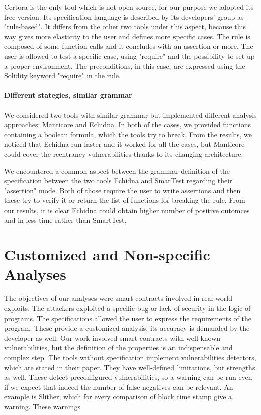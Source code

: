Certora is the only tool which is not open-source, for our purpose we adopted its free version.
Its specification language is described by its developers' group as "rule-based". It differs from the other two tools under this aspect, because this way gives more elasticity to the user and defines more specific cases.
The rule is composed of some function calls and it concludes with an assertion or more. The user is allowed to test a specific case, using "require" and the possibility to set up a proper environment. 
The preconditions, in this case, are expressed using the Solidity keyword "require" in the rule.

\paragraph{Different stategies, similar grammar}
We considered two tools with similar grammar but implemented different analysis approaches: Manticore and Echidna. 
In both of the cases, we provided functions containing a boolean formula, which the tools try to break. From the results, 
we noticed that Echidna run faster and it worked for all the cases, but Manticore could cover the reentrancy vulnerabilities thanks to its changing architecture.

We encountered a common aspect between the grammar definition of the specification between the two tools Echidna and SmarTest regarding their "assertion" mode. 
Both of those require the user to write assertions and then these try to verify it or return the list of 
functions for breaking the rule. From our results, it is clear Echidna could obtain higher number of positive outomces and in less time rather than SmartTest.




\section{Customized and Non-specific Analyses}
The objectives of our analyses were smart contracts involved in real-world exploits. The attackers exploited a specific bug or lack of security in the logic of programs. The specifications allowed the user to express the requirements of the program. These provide a customized analysis, its accuracy is demanded by the developer as well. Our work involved smart contracts with well-known vulnerabilities, but the definition of the properties is an indispensable and complex step.
The tools without specification implement vulnerabilities detectors, which are stated in their paper. They have well-defined limitations, but strengths as well. These detect preconfigured vulnerabilities, so a warning can be run even if we expect that indeed the number of false negatives can be relevant.
An example is Slither, which for every comparison of block time stamp give a warning. These warnings 

